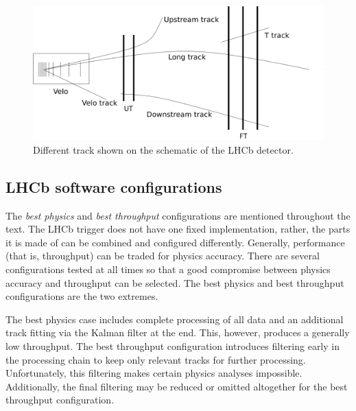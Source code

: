 \documentclass[12pt]{article}
\begin{document}
\begin{figure}[H]
	\begin{center}
		\includegraphics[width=\textwidth]{lhcb_track_types}
	\end{center}
	\caption[Types of tracks for LHCb]{Different track shown on the schematic of the LHCb detector.}
	\label{fig_lhcb_track_types}
\end{figure}


\subsection{LHCb software configurations}

The \textit{best physics} and \textit{best throughput} configurations are mentioned throughout the text. The LHCb trigger does not have one fixed implementation, rather, the parts it is made of can be combined and configured differently. Generally, performance (that is, throughput) can be traded for physics accuracy. There are several configurations tested at all times so that a good compromise between physics accuracy and throughput can be selected. The best physics and best throughput configurations are the two extremes.

The best physics case includes complete processing of all data and an additional track fitting via the Kalman filter at the end. This, however, produces a generally low throughput. The best throughput configuration introduces filtering early in the processing chain to keep only relevant tracks for further processing. Unfortunately, this filtering makes certain physics analyses impossible. Additionally, the final filtering may be reduced or omitted altogether for the best throughput configuration.


\end{document}
